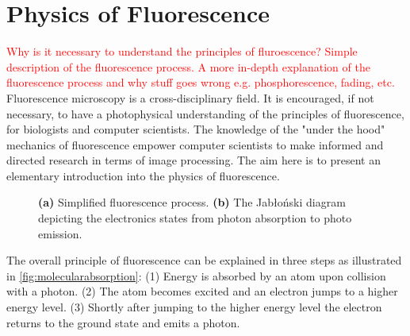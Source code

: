 
\section{Physics of Fluorescence}
\label{sec:PhysicsOfFluorescence}

\textcolor{red}{Why is it necessary to understand the principles of fluroescence? Simple description of the fluorescence process. A more in-depth explanation of the fluorescence process and why stuff goes wrong  e.g. phosphorescence, fading, etc.}
Fluorescence microscopy is a cross-disciplinary field.
It is encouraged, if not necessary, to have a photophysical understanding of the principles of fluorescence, for biologists and computer scientists.
The knowledge of the "under the hood" mechanics of fluorescence empower computer scientists to make informed and directed research in terms of image processing.
The aim here is to present an elementary introduction into the physics of fluorescence.

\begin{figure}[!t]
	\centering
	\caption{\textbf{(a)} Simplified fluorescence process. \textbf{(b)} The Jab{\l}o{\'n}ski diagram depicting the electronics states from photon absorption to photo emission.}
	\label{fig:fluorescence_electron_states}
\end{figure}

The overall principle of fluorescence can be explained in three steps \citep{Nobel2016} as illustrated in \autoref{fig:molecularabsorption}: 
(1) Energy is absorbed by an atom upon collision with a photon.
(2) The atom becomes excited and an electron jumps to a higher energy level.
(3) Shortly after jumping to the higher energy level the electron returns to the ground state and emits a photon.

